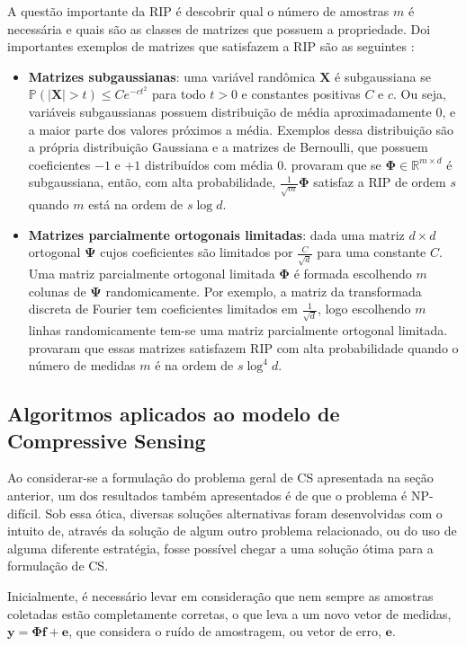 \documentclass[cic,tc]{iiufrgs}
\renewcommand{\vec}[1]{\bm{#1}}
\newcommand{\mat}[1]{\bm{#1}}
\begin{document}
A questão importante da RIP é descobrir qual o número de amostras $m$ é necessária e quais são as 
classes de matrizes que possuem a propriedade. Doi importantes exemplos de matrizes que satisfazem a RIP são
as seguintes \cite{chen2015compressed}: 
\begin{itemize}
    \item \textbf{Matrizes subgaussianas}: uma variável randômica $\mat{X}$ é subgaussiana se 
    $\mathbb{P}(|\mat{X}| > t) \le Ce^{-ct^2}$ para todo $t>0$ e constantes positivas $C$ e $c$. Ou seja,
    variáveis subgaussianas possuem distribuição de média aproximadamente $0$, e a maior parte dos valores
    próximos a média. Exemplos dessa distribuição são a própria distribuição Gaussiana e a matrizes de 
    Bernoulli, que possuem coeficientes $-1$ e $+1$ distribuídos com média $0$. \citet{Mendelson2008} provaram que
    se $\mat{\Phi} \in \mathbb{R}^{m\times d}$ é subgaussiana, então, com alta probabilidade, $\frac{1}{\sqrt{m}}\mat{\Phi}$
    satisfaz a RIP de ordem $s$ quando $m$ está na ordem de $s\log{d}$.
    \item \textbf{Matrizes parcialmente ortogonais limitadas}: dada uma matriz $d\times d$ ortogonal $\mat{\Psi}$
    cujos coeficientes são limitados por $\frac{C}{\sqrt{d}}$ para uma constante $C$. Uma matriz parcialmente
    ortogonal limitada $\mat{\Phi}$ é formada escolhendo $m$ colunas de $\mat{\Psi}$ randomicamente.
    Por exemplo, a matriz da transformada discreta de Fourier tem coeficientes limitados em $\frac{1}{\sqrt{d}}$,
    logo escolhendo $m$ linhas randomicamente tem-se uma matriz parcialmente ortogonal limitada.
    \citet{rudelson2008sparse} provaram que essas matrizes satisfazem RIP com alta probabilidade quando
    o número de medidas $m$ é na ordem de $s\log^4{d}$.
\end{itemize}


\subsection{Algoritmos aplicados ao modelo de Compressive Sensing}
\label{sec:csalgo}
Ao considerar-se a formulação do problema geral de CS apresentada na seção anterior, um dos resultados também apresentados
é de que o problema é NP-difícil. Sob essa ótica, diversas soluções alternativas foram desenvolvidas com 
o intuito de, através da solução de algum outro problema relacionado, ou do uso de alguma diferente estratégia, fosse possível 
chegar a uma solução ótima para a formulação de CS. 

Inicialmente, é necessário levar em consideração que nem sempre as amostras coletadas estão completamente corretas,
o que leva a um novo vetor de medidas, $\vec{y} = \mathbf{\Phi} \vec{f} + \vec{e}$, que considera o ruído de amostragem, 
ou vetor de erro, $\vec{e}$.
\end{document}
